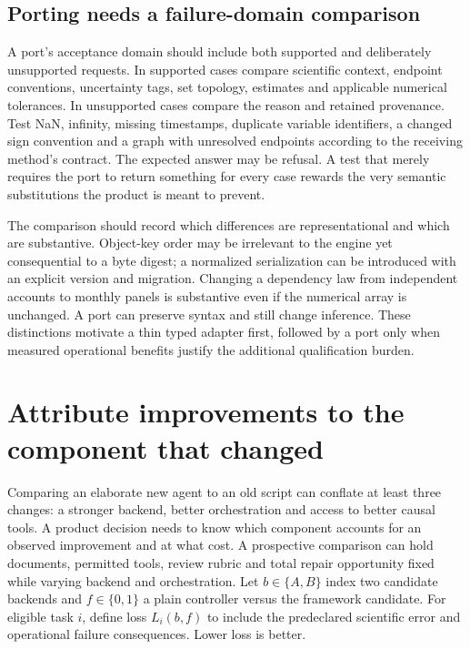 \subsection{Porting needs a failure-domain comparison}

A port's acceptance domain should include both supported and deliberately
unsupported requests. In supported cases compare scientific context,
endpoint conventions, uncertainty tags, set topology, estimates and
applicable numerical tolerances. In unsupported cases compare the reason
and retained provenance. Test NaN, infinity, missing timestamps, duplicate
variable identifiers, a changed sign convention and a graph with unresolved
endpoints according to the receiving method's contract. The expected
answer may be refusal. A test that merely requires the port to return
something for every case rewards the very semantic substitutions the
product is meant to prevent.

The comparison should record which differences are representational and
which are substantive. Object-key order may be irrelevant to the engine
yet consequential to a byte digest; a normalized serialization can be
introduced with an explicit version and migration. Changing a dependency
law from independent accounts to monthly panels is substantive even if
the numerical array is unchanged. A port can preserve syntax and still
change inference. These distinctions motivate a thin typed adapter first,
followed by a port only when measured operational benefits justify the
additional qualification burden.

\section{Attribute improvements to the component that changed}
\label{exec14:l6-factorial}

Comparing an elaborate new agent to an old script can conflate at least
three changes: a stronger backend, better orchestration and access to
better causal tools. A product decision needs to know which component
accounts for an observed improvement and at what cost. A prospective
comparison can hold documents, permitted tools, review rubric and total
repair opportunity fixed while varying backend and orchestration. Let
$b\in\{A,B\}$ index two candidate backends and $f\in\{0,1\}$ a plain
controller versus the framework candidate. For eligible task $i$, define
loss $L_i(b,f)$ to include the predeclared scientific error and operational
failure consequences. Lower loss is better.

